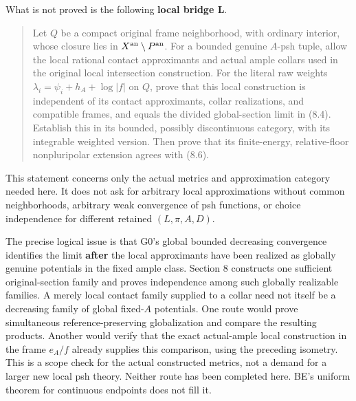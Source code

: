 \documentclass[
  10pt,
]{article}
\begin{document}
What is not proved is the following \textbf{local bridge L}.

\begin{quote}
Let \(Q\) be a compact original frame neighborhood, with ordinary
interior, whose closure lies in \(X^{\rm an}\setminus P^{\rm an}\). For
a bounded genuine \(A\)-psh tuple, allow the local rational contact
approximants and actual ample collars used in the original local
intersection construction. For the literal raw weights
\(\lambda_i=\psi_i+h_A+\log|f|\) on \(Q\), prove that this local
construction is independent of its contact approximants, collar
realizations, and compatible frames, and equals the divided
global-section limit in (8.4). Establish this in its bounded, possibly
discontinuous category, with its integrable weighted version. Then prove
that its finite-energy, relative-floor nonpluripolar extension agrees
with (8.6).
\end{quote}

This statement concerns only the actual metrics and approximation
category needed here. It does not ask for arbitrary local approximations
without common neighborhoods, arbitrary weak convergence of psh
functions, or choice independence for different retained
\((L,\pi,A,D)\).

The precise logical issue is that G0's global bounded decreasing
convergence identifies the limit \textbf{after} the local approximants
have been realized as globally genuine potentials in the fixed ample
class. Section 8 constructs one sufficient original-section family and
proves independence among such globally realizable families. A merely
local contact family supplied to a collar need not itself be a
decreasing family of global fixed-\(A\) potentials. One route would
prove simultaneous reference-preserving globalization and compare the
resulting products. Another would verify that the exact actual-ample
local construction in the frame \(e_A/f\) already supplies this
comparison, using the preceding isometry. This is a scope check for the
actual constructed metrics, not a demand for a larger new local psh
theory. Neither route has been completed here. BE's uniform theorem for
continuous endpoints does not fill it.
\end{document}
